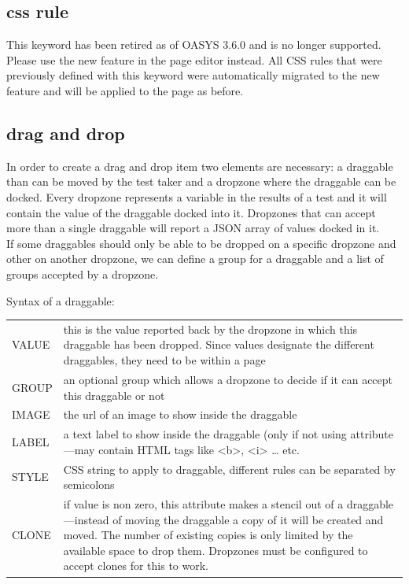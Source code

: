 \documentclass[12pt]{article} %
\newenvironment{keyword}{\leavevmode\color{magenta}}{}
\newenvironment{properties}
	{
    	\footnotesize\renewcommand{\arraystretch}{1.30}
  		\renewcommand{\tabcolsep}{0pt}
   		\begin{longtable}{>{\begin{keyword}}p{3.1cm}<{\end{keyword}}p{13.9cm}}
    	\hline
	}
	{
		\hline\end{longtable}\vspace{5mm}
	}
\begin{document}
\subsection{css rule}\label{subsec:css-rule}

This keyword has been retired as of OASYS 3.6.0 and is no longer supported. Please use the new  feature in the page editor instead. All CSS rules that were previously defined with this keyword were automatically migrated to the new feature and will be applied to the page as before. \\

\subsection{drag and drop}\label{subsec:drag-and-drop}

In order to create a drag and drop item two elements are necessary: a draggable than can be moved by the test taker and a dropzone where the draggable can be docked.
Every dropzone represents a variable in the results of a test and it will contain the value of the draggable docked into it.
Dropzones that can accept more than a single draggable will report a JSON array of values docked in it. \\

If some draggables should only be able to be dropped on a specific dropzone and other on another dropzone, we can define a group for a draggable and a list of groups accepted by a dropzone.

Syntax of a draggable:\hspace{0.5cm}\kw{[@DG ... @]}

\begin{properties}
\hline
VALUE & this is the value reported back by the dropzone in which this draggable has been dropped.
Since values designate the different draggables, they need to be within a page \\
GROUP & an optional group which allows a dropzone to decide if it can accept this draggable or not \\
IMAGE & the url of an image to show inside the draggable \\
LABEL & a text label to show inside the draggable (only if not using \kw{IMAGE} attribute—may contain HTML tags like <b>, <i> … etc. \\
STYLE & CSS string to apply to draggable, different rules can be separated by semicolons \\
CLONE & if value is non zero, this attribute makes a stencil out of a draggable—instead of moving the draggable a copy of it will be created and moved.
The number of existing copies is only limited by the available space to drop them. Dropzones must be configured to accept clones for this to work. \\
\hline
\end{properties}
\vspace{0.1cm}
\end{document}
